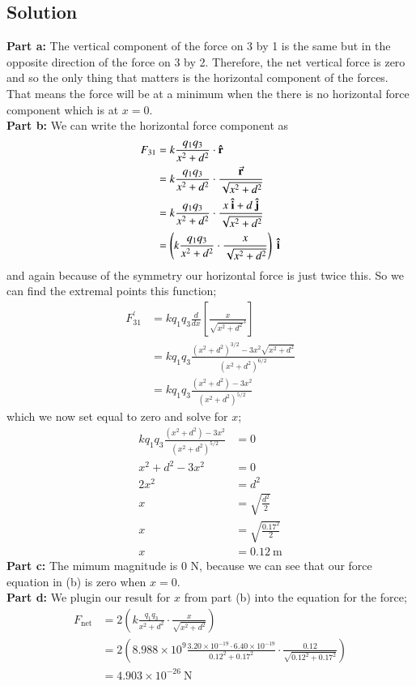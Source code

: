 \documentclass{article}
\begin{document}
\subsection*{Solution}
\textbf{Part a:} The vertical component of the force on 3 by 1 is the same but in the opposite direction of the force on 3 by 2. Therefore, the net vertical force is zero and so the only thing that matters is the horizontal component of the forces. That means the force will be at a minimum when the there is no horizontal force component which is at $x = 0$. \vspace{12pt} \\
\textbf{Part b:} We can write the horizontal force component as
\begin{align*}
	F_{31} &= k \frac{q_1q_3}{x^2 + d^2} \cdot \vu r \\
	&= k \frac{q_1q_3}{x^2 + d^2} \cdot \frac{\va r}{\sqrt{x^2 + d^2}} \\
	&= k \frac{q_1q_3}{x^2 + d^2} \cdot \frac{x\ \vu i + d\ \vu j}{\sqrt{x^2 + d^2}} \\
	&= \left( k \frac{q_1q_3}{x^2 + d^2} \cdot \frac{x}{\sqrt{x^2 + d^2}} \right)\ \vu i
\end{align*}
and again because of the symmetry our horizontal force is just twice this. So we can find the extremal points this function;
\begin{align*}
	F_{31}^\prime &= k q_1 q_3 \frac{d}{dx}\left[\frac{x}{\sqrt{x^2 + d^2}^3}\right] \\
		      &= k q_1 q_3 \frac{\left(x^2 + d^2\right)^{3/2} - 3x^2\sqrt{x^2 + d^2}}{\left( x^2 + d^2 \right)^{6/2}} \\
		      &= k q_1 q_3 \frac{\left(x^2 + d^2\right) - 3x^2}{\left( x^2 + d^2 \right)^{5/2}}
\end{align*}
which we now set equal to zero and solve for $x$;
\begin{align*}
	k q_1 q_3 \frac{\left(x^2 + d^2\right) - 3x^2}{\left( x^2 + d^2 \right)^{5/2}} &= 0 \\
	x^2 + d^2 - 3x^2 &= 0 \\
	2x^2 &= d^2 \\
	x &= \sqrt{\frac{d^2}{2}} \\
	x &= \sqrt{\frac{0.17^2}{2}} \\
	x &= \boxed{0.12\ \text{m}}
\end{align*}
\textbf{Part c:} The mimum magnitude is 0 N, because we can see that our force equation in (b) is zero when $x=0$. \vspace{12pt} \\
\textbf{Part d:} We plugin our result for $x$ from part (b) into the equation for the force;
\begin{align*}
	F_\text{net} &= 2 \left( k \frac{q_1q_3}{x^2 + d^2} \cdot \frac{x}{\sqrt{x^2 + d^2}} \right) \\
	&= 2 \left( 8.988 \times 10^9 \frac{3.20 \times 10^{-19} \cdot 6.40 \times 10^{-19}}{0.12^2 + 0.17^2} \cdot \frac{0.12}{\sqrt{0.12^2 + 0.17^2}} \right) \\
	&= \boxed{4.903\times 10^{-26}\ \text{N}}
\end{align*}
\end{document}

